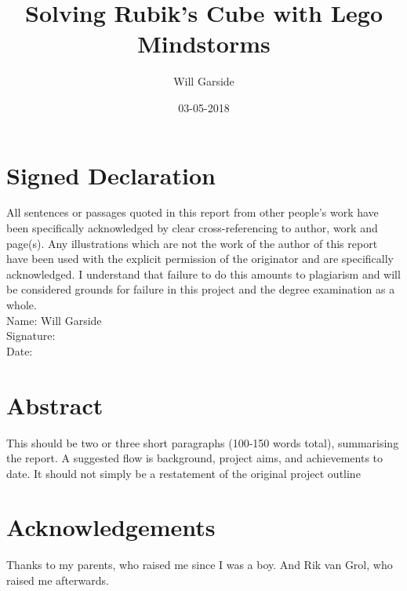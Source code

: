 \documentclass{report}
\title{Solving Rubik's Cube with Lego Mindstorms}
\date{03-05-2018}
\author{Will Garside}
\begin{document}
	\maketitle
	\newpage
	
	\renewcommand{\thechapter}{\Roman{chapter}}
	\chapter{Signed Declaration}
	All sentences or passages quoted in this report from other people's work have been specifically acknowledged by clear cross-referencing to author, work and page(s). Any illustrations which are not the work of the author of this report have been used with the explicit permission of the originator and are specifically acknowledged. I understand that failure to do this amounts to plagiarism and will be considered grounds for failure in this project and the degree examination as a whole.
	\\Name: Will Garside
	\\Signature:
	\\Date: 

	\newpage
	\chapter{Abstract}
	This should be two or three short paragraphs (100-150 words total), summarising the report. A suggested flow is background, project aims, and achievements to date. It should not simply be a restatement of the original project outline
	
	\newpage
	\chapter{Acknowledgements}
	Thanks to my parents, who raised me since I was a boy. And Rik van Grol, who raised me afterwards.
	
	\newpage
\end{document}
